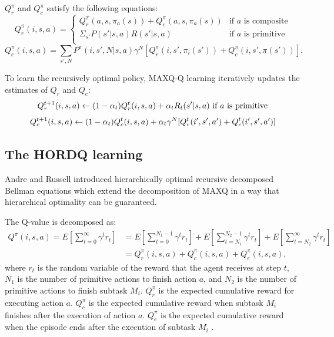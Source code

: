 $Q_r^{\pi}$ and $Q_c^{\pi}$ satisfy the following equations:
\begin{equation}
    Q_r^{\pi}(i, s, a) = 
    \left\{\begin{array}{ll}
        Q_r^{\pi}(a, s, \pi_a(s)) + Q_c^{\pi}(a, s, \pi_a(s))& \mbox{if $a$ is composite} \\
        \Sigma_{s'} P(s'|s, a)R(s'|s, a) & \mbox{if $a$ is primitive} \\  
    \end{array} \right.
\end{equation}
\begin{equation}
    Q_c^{\pi}(i, s, a) = \sum_{s', N} P^{\pi}(i, s', N|s, a)\gamma^N[Q_r^{\pi}(i, s', \pi_i(s')) + Q_c^{\pi}(i, s', \pi(s'))],
\end{equation}

To learn the recursively optimal policy, MAXQ-Q learning iteratively updates
the estimates of $Q_r$ and $Q_c$:
\begin{equation}
    Q_r^{t+1}(i, s, a) \leftarrow
    (1 - \alpha_t)Q_r^t(i, s, a) + \alpha_t R_t(s'| s, a)   \mbox{ if $a$ is primitive} \\
\end{equation}
\begin{equation}
    Q_c^{t+1}(i, s, a) \leftarrow
    (1 - \alpha_t)Q_c^t(i, s, a) + \alpha_t \gamma^N[Q_r^{t}(i', s', a') + Q_c^t(i', s', a')] \\
\end{equation}


\subsection{The HORDQ learning}

Andre and Russell \cite{HORDQ} introduced hierarchically optimal recursive decomposed Bellman equations
which extend the decomposition of MAXQ in a way that hierarchical optimality can be guaranteed.

The Q-value is decomposed as:
\begin{align}
    Q^{\pi}(i, s, a) = E[\sum_{t=0}^{\infty}\gamma^t r_t] &= E[\sum_{t=0}^{N_1 - 1}\gamma^t r_t] + E[\sum_{t=N_1}^{N_2 - 1}\gamma^t r_t] + E[\sum_{t=N_2}^{\infty}\gamma^t r_t]\\
                    &= Q_r^{\pi}(i, s, a) + Q_c^{\pi}(i, s, a) + Q_e^{\pi}(i, s, a),
\end{align}
where $r_t$ is the random variable of the reward that the agent receives at step $t$, $N_1$ is the number of primitive actions to finish action $a$, 
and $N_2$ is the number of primitive actions 
to finish subtask $M_i$. $ Q_r^{\pi}$ is the expected cumulative reward for executing action $a$.
$Q_c^{\pi}$ is the expected cumulative reward when subtask $M_i$ finishes after the execution of action $a$. 
$Q_e^{\pi}$ is the expected cumulative reward when the episode ends after the execution of subtask $M_i$ .

